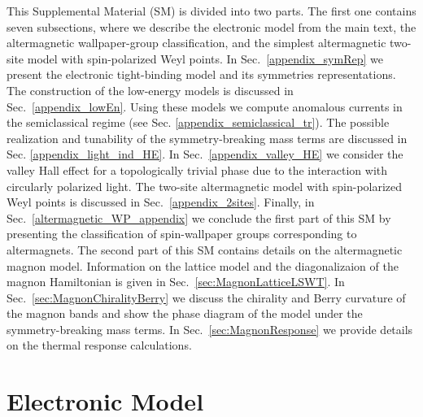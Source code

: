 \documentclass[aps,preprintnumbers,amsmath,amssymb]{revtex4-2}
\begin{document}
This Supplemental Material (SM) is divided into two parts. The first one contains
seven subsections, where we describe the electronic model from the main text, the altermagnetic wallpaper-group classification, and the simplest altermagnetic two-site model with spin-polarized Weyl points. In Sec.~\ref{appendix_symRep} we present the electronic tight-binding model and its symmetries representations. The construction of the low-energy models is discussed in Sec.~\ref{appendix_lowEn}. Using these models we compute anomalous currents in the semiclassical regime (see Sec. \ref{appendix_semiclassical_tr}). The possible realization and tunability of the symmetry-breaking mass terms are discussed in Sec. \ref{appendix_light_ind_HE}. In Sec.~\ref{appendix_valley_HE} we consider the valley Hall effect for a topologically trivial phase due to the interaction with circularly polarized light. The two-site altermagnetic model with spin-polarized Weyl points is discussed in Sec.~\ref{appendix_2sites}. 
Finally, in Sec.~\ref{altermagnetic_WP_appendix} we conclude 
the first part of this SM by presenting the classification of spin-wallpaper groups corresponding to altermagnets.
The second part of this SM contains details on the altermagnetic magnon model. Information on the lattice model and the diagonalizaion of the magnon Hamiltonian is given in Sec.~\ref{sec:MagnonLatticeLSWT}. In Sec.~\ref{sec:MagnonChiralityBerry} we discuss the chirality and Berry curvature of the magnon bands and show the phase diagram of the model under the symmetry-breaking mass terms. In Sec.~\ref{sec:MagnonResponse} we provide details on the thermal response calculations.




\newpage

\section{Electronic Model}
\end{document}
